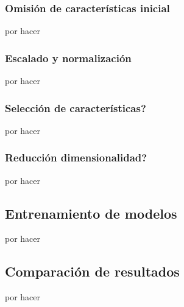 \subsubsection{Omisión de características inicial}
por hacer

\subsubsection{Escalado y normalización}
por hacer

\subsubsection{Selección de características?}
por hacer

\subsubsection{Reducción dimensionalidad?}
por hacer

\subsection{Entrenamiento de modelos}

por hacer

\subsection{Comparación de resultados}

por hacer

